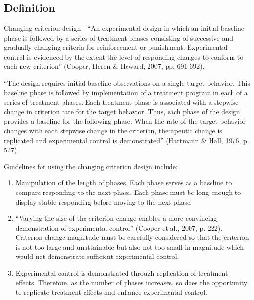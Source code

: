 \clearpage \section{\fourbSix{}}
\subsection{Definition} 
Changing criterion design - ``An experimental design in which an initial baseline phase is followed by a series of treatment phases consisting of successive and gradually changing criteria for reinforcement or punishment. Experimental control is evidenced by the extent the level of responding changes to conform to each new criterion'' (Cooper, Heron \& Heward, 2007, pp. 691-692).

``The design requires initial baseline observations on a single target behavior. This baseline phase is followed by implementation of a treatment program in each of a series of treatment phases. Each treatment phase is associated with a stepwise change in criterion rate for the target behavior. Thus, each phase of the design provides a baseline for the following phase. When the rate of the target behavior changes with each stepwise change in the criterion, therapeutic change is replicated and experimental control is demonstrated'' (Hartmann \& Hall, 1976, p. 527).

Guidelines for using the changing criterion design include:
\begin{enumerate}
\item Manipulation of the length of phases. Each phase serves as a baseline to compare responding to the next phase. Each phase must be long enough to display stable responding before moving to the next phase.
\item ``Varying the size of the criterion change enables a more convincing demonstration of experimental control'' (Cooper et al., 2007, p. 222). Criterion change magnitude must be carefully considered so that the criterion is not too large and unattainable but also not too small in magnitude which would not demonstrate sufficient experimental control.
\item Experimental control is demonstrated through replication of treatment effects. Therefore, as the number of phases increases, so does the opportunity to replicate treatment effects and enhance experimental control.
\end{enumerate}
%
